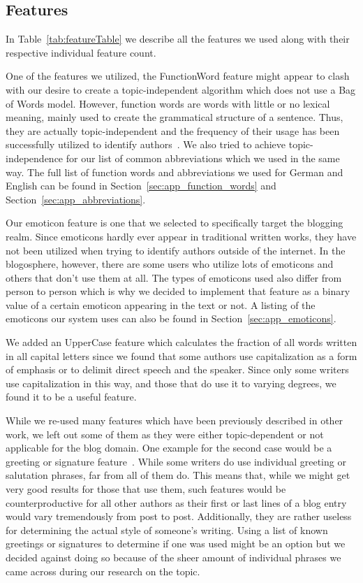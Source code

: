\subsection{Features}
\label{sec:impl_features}

In Table~\ref{tab:featureTable} we describe all the features we used along with their respective individual feature count.


One of the features we utilized, the FunctionWord feature might appear to clash with our desire to create a topic-independent algorithm which does not use a Bag of Words model.
However, function words are words with little or no lexical meaning, mainly used to create the grammatical structure of a sentence.
Thus, they are actually topic-independent and the frequency of their usage has been successfully utilized to identify authors~\cite{mosteller1962applied}.
We also tried to achieve topic-independence for our list of common abbreviations which we used in the same way.
The full list of function words and abbreviations we used for German and English can be found in Section~\ref{sec:app_function_words} and Section~\ref{sec:app_abbreviations}.


Our emoticon feature is one that we selected to specifically target the blogging realm.
Since emoticons hardly ever appear in traditional written works, they have not been utilized when trying to identify authors outside of the internet.
In the blogosphere, however, there are some users who utilize lots of emoticons and others that don't use them at all.
The types of emoticons used also differ from person to person which is why we decided to implement that feature as a binary value of a certain emoticon appearing in the text or not.
A listing of the emoticons our system uses can also be found in Section~\ref{sec:app_emoticons}.


We added an UpperCase feature which calculates the fraction of all words written in all capital letters since we found that some authors use capitalization as a form of emphasis or to delimit direct speech and the speaker.
Since only some writers use capitalization in this way, and those that do use it to varying degrees, we found it to be a useful feature.


While we re-used many features which have been previously described in other work, we left out some of them as they were either topic-dependent or not applicable for the blog domain.
One example for the second case would be a greeting or signature feature~\cite{de2001mining}.
While some writers do use individual greeting or salutation phrases, far from all of them do.
This means that, while we might get very good results for those that use them, such features would be counterproductive for all other authors as their first or last lines of a blog entry would vary tremendously from post to post.
Additionally, they are rather useless for determining the actual style of someone's writing.
Using a list of known greetings or signatures to determine if one was used might be an option but we decided against doing so because of the sheer amount of individual phrases we came across during our research on the topic.


